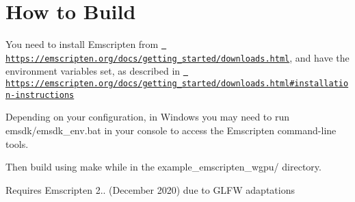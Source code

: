 \chapter{How to Build}
\hypertarget{md__2_users_2thibault_2kdrive_21-_p_r_o_j_e_c_t_s_2_p-42_2push__swap_2push__swap__visualizer_2bu48650f169728873f46544f8f4d0ab0cb}{}\label{md__2_users_2thibault_2kdrive_21-_p_r_o_j_e_c_t_s_2_p-42_2push__swap_2push__swap__visualizer_2bu48650f169728873f46544f8f4d0ab0cb}
\label{md__2_users_2thibault_2kdrive_21-_p_r_o_j_e_c_t_s_2_p-42_2push__swap_2push__swap__visualizer_2bu48650f169728873f46544f8f4d0ab0cb_autotoc_md802}%
%



\begin{DoxyItemize}
\item You need to install Emscripten from \href{https://emscripten.org/docs/getting_started/downloads.html}{\texttt{ https\+://emscripten.\+org/docs/getting\+\_\+started/downloads.\+html}}, and have the environment variables set, as described in \href{https://emscripten.org/docs/getting_started/downloads.html\#installation-instructions}{\texttt{ https\+://emscripten.\+org/docs/getting\+\_\+started/downloads.\+html\#installation-\/instructions}}
\item Depending on your configuration, in Windows you may need to run {\ttfamily emsdk/emsdk\+\_\+env.\+bat} in your console to access the Emscripten command-\/line tools.
\item Then build using {\ttfamily make} while in the {\ttfamily example\+\_\+emscripten\+\_\+wgpu/} directory.
\item Requires Emscripten 2.. (December 2020) due to GLFW adaptations 
\end{DoxyItemize}